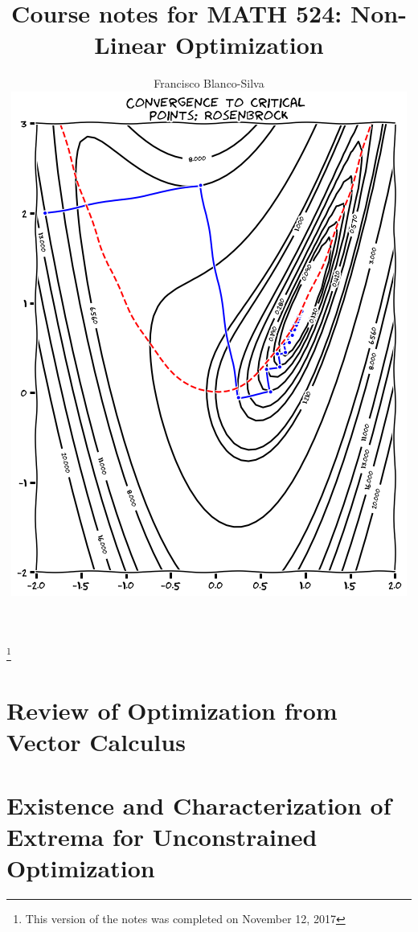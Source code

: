 \documentclass[11pt, reqno]{amsbook}
\begin{document}
\frontmatter
\title[Non-Linear Optimization]{Course notes for MATH 524: Non-Linear Optimization}
\author[F.J.~Blanco-Silva]{Francisco Blanco-Silva \\ \separator \includegraphics[width=0.75\linewidth]{images/SDR3.png}}
\address{Department of Mathematics\\ 
University of South Carolina}
\thanks{This version of the notes was completed on November 12, 2017}
\maketitle
\tableofcontents
\listoffigures

\mainmatter

\chapter{Review of Optimization from Vector Calculus}
\label{chapter:intro}



\chapter[Unconstrained Optimization]{Existence and Characterization of Extrema for Unconstrained Optimization}
\label{chapter:UnconstrainedExistenceCharacterization}


\end{document}
